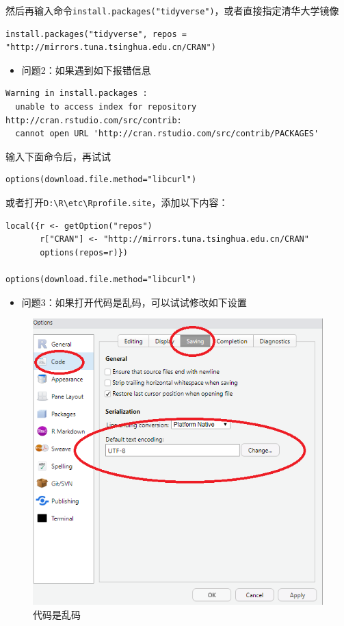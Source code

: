 \documentclass[
]{book}
\providecommand{\tightlist}{%
  \setlength{\itemsep}{0pt}\setlength{\parskip}{0pt}}
\begin{document}
然后再输入命令\texttt{install.packages("tidyverse")}，或者直接指定清华大学镜像

\begin{verbatim}
install.packages("tidyverse", repos = "http://mirrors.tuna.tsinghua.edu.cn/CRAN")
\end{verbatim}

\begin{itemize}
\tightlist
\item
  问题2：如果遇到如下报错信息
\end{itemize}

\begin{verbatim}
Warning in install.packages :
  unable to access index for repository http://cran.rstudio.com/src/contrib:
  cannot open URL 'http://cran.rstudio.com/src/contrib/PACKAGES'
\end{verbatim}

输入下面命令后，再试试

\begin{verbatim}
options(download.file.method="libcurl")
\end{verbatim}

或者打开\texttt{D:\textbackslash{}R\textbackslash{}etc\textbackslash{}Rprofile.site}，添加以下内容：

\begin{verbatim}
local({r <- getOption("repos")
       r["CRAN"] <- "http://mirrors.tuna.tsinghua.edu.cn/CRAN"
       options(repos=r)})

options(download.file.method="libcurl")
\end{verbatim}

\begin{itemize}
\tightlist
\item
  问题3：如果打开代码是乱码，可以试试修改如下设置
\end{itemize}

\begin{figure}
\centering
\includegraphics{figure/18.png}
\caption{代码是乱码}
\end{figure}
\end{document}

